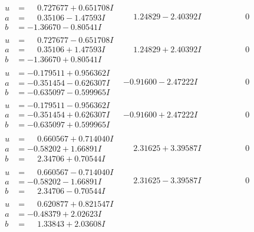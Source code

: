 \documentclass[1p]{elsarticle_modified}
\theoremstyle{definition}
\begin{document}
$$\begin{array}{c|c|c}
\begin{aligned}
u &= \phantom{-}0.727677 + 0.651708 I \\
a &= \phantom{-}0.35106 - 1.47593 I \\
b &= -1.36670 - 0.80541 I\end{aligned}
 & \phantom{-}1.24829 - 2.40392 I & \phantom{-0.000000 } 0 \\ \hline\begin{aligned}
u &= \phantom{-}0.727677 - 0.651708 I \\
a &= \phantom{-}0.35106 + 1.47593 I \\
b &= -1.36670 + 0.80541 I\end{aligned}
 & \phantom{-}1.24829 + 2.40392 I & \phantom{-0.000000 } 0 \\ \hline\begin{aligned}
u &= -0.179511 + 0.956362 I \\
a &= -0.351454 - 0.626307 I \\
b &= -0.635097 - 0.599965 I\end{aligned}
 & -0.91600 - 2.47222 I & \phantom{-0.000000 } 0 \\ \hline\begin{aligned}
u &= -0.179511 - 0.956362 I \\
a &= -0.351454 + 0.626307 I \\
b &= -0.635097 + 0.599965 I\end{aligned}
 & -0.91600 + 2.47222 I & \phantom{-0.000000 } 0 \\ \hline\begin{aligned}
u &= \phantom{-}0.660567 + 0.714040 I \\
a &= -0.58202 + 1.66891 I \\
b &= \phantom{-}2.34706 + 0.70544 I\end{aligned}
 & \phantom{-}2.31625 + 3.39587 I & \phantom{-0.000000 } 0 \\ \hline\begin{aligned}
u &= \phantom{-}0.660567 - 0.714040 I \\
a &= -0.58202 - 1.66891 I \\
b &= \phantom{-}2.34706 - 0.70544 I\end{aligned}
 & \phantom{-}2.31625 - 3.39587 I & \phantom{-0.000000 } 0 \\ \hline\begin{aligned}
u &= \phantom{-}0.620877 + 0.821547 I \\
a &= -0.48379 + 2.02623 I \\
b &= \phantom{-}1.33843 + 2.03608 I\end{aligned}

\end{array}$$
\end{document}
